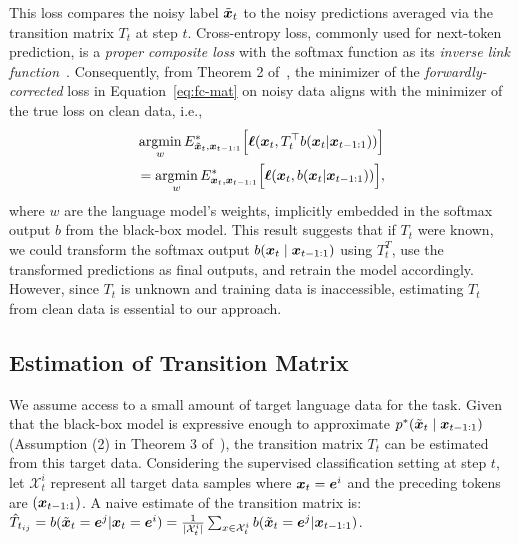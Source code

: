 This loss compares the noisy label $\tilde {\bm{x}}_t$ to the noisy predictions averaged via the transition matrix $T_t$ at step $t$. Cross-entropy loss, commonly used for next-token prediction, is a \emph{proper composite loss} with the softmax function as its \emph{inverse link function}~\citep{patrini2017making}. Consequently, from Theorem 2 of~\citet{patrini2017making}, the minimizer of the \emph{forwardly-corrected} loss in Equation~\eqref{eq:fc-mat} on noisy data aligns with the minimizer of the true loss on clean data, i.e., 
\begin{align*}
    \label{eq:loss-minimizers}
    & \operatorname*{argmin}_{w} E^*_{\tilde {\bm{x}}_t,\bm{x}_{t-1:1}}\Big[\bm{\ell}(\bm{x}_t, T_t^\top b(\bm{x}_t|\bm{x}_{t-1:1})) \Big] \\ &= 
    \operatorname*{argmin}_{w} E^*_{\bm{x}_t,\bm{x}_{t-1:1}}\Big[\bm{\ell}(\bm{x}_t, b(\bm{x}_t|\bm{x}_{t-1:1})) \Big],
\end{align*}
where $w$ are the language model’s weights, implicitly embedded in the softmax output $b$ from the black-box model. This result suggests that if $T_t$ were known, we could transform the softmax output $b(\bm{x}_t \mid \bm{x}_{t-1:1})$ using $T_t^T$, use the transformed predictions as final outputs, and retrain the model accordingly. However, since $T_t$ is unknown and training data is inaccessible, estimating $T_t$ from clean data is essential to our approach.


\subsection{Estimation of Transition Matrix}
\label{ssec:estimatingT}


We assume access to a small amount of target language data for the task. Given that the black-box model is expressive enough to approximate $p^*(\tilde{\bm{x}}_t \mid \bm{x}_{t-1:1})$ (Assumption (2) in Theorem 3 of~\citet{patrini2017making}), the transition matrix $T_t$ can be estimated from this target data. Considering the supervised classification setting at step $t$, let $\mathcal{X}_t^i$ represent all target data samples where $\bm{x}_t = \bm{e}^i$ and the preceding tokens are $(\bm{x}_{t-1:1})$. A naive estimate of the transition matrix is: $\hat T_{t_{ij}}=b(\tilde {\bm{x}}_t = \bm{e}^j|\bm{x}_t=\bm{e}^i)=\frac{1}{|\mathcal{X}_t^i|}\sum_{x\in\mathcal{X}_t^i}b(\tilde {\bm{x}}_t = \bm{e}^j|\bm{x}_{t-1:1})$.


